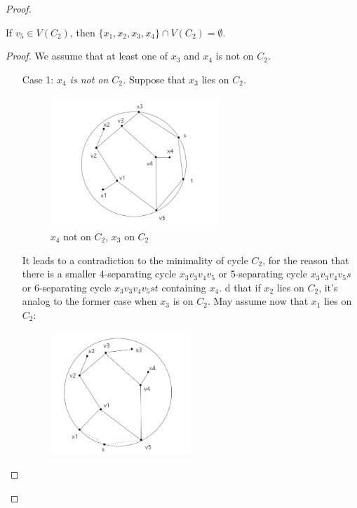 \begin{proof}
\begin{itemize}
\begin{lemma}
If $v_5 \in V(C_2)$, then $\{x_1, x_2, x_3, x_4\} \cap V(C_2) = \emptyset$.
\end{lemma}
\begin{proof}
We assume that at least one of $x_3$ and $x_4$ is not on $C_2$.
\begin{itemize}
    \item[Case 1:] \textit{\textit{$x_4$ is not on $C_2$.}} Suppose that $x_3$ lies on $C_2$. \begin{figure}[H] %
    \centering %
    \includegraphics[width=0.6\textwidth]{figure/x4notonc2.png} 
    \caption{$x_4$ not on $C_2$, $x_3$ on $C_2$} %
    \label{figure} %
    \end{figure}
    It leads to a contradiction to the minimality of cycle $C_2$, for the reason that there is a smaller 4-separating cycle $x_3v_3v_4v_5$ or 5-separating cycle $x_3v_3v_4v_5s$ or 6-separating cycle $x_3v_3v_4v_5st$ containing $x_4$. d that if $x_2$ lies on $C_2$, it's analog to the former case when $x_3$ is on $C_2$. May assume now that $x_1$ lies on $C_2$:
    \begin{figure}[H] %
    \centering %
    \includegraphics[width=0.5\textwidth]{figure/x1notonc2.png} 

\end{figure}
\end{itemize}
\end{proof}
\end{itemize}
\end{proof}

